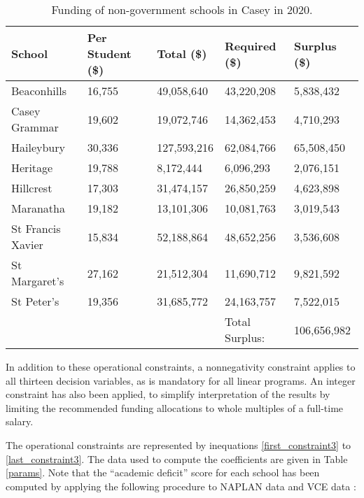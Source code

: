 \documentclass[11pt, a4paper]{article}
\begin{document}
    \begin{table}[!ht]
        \centering
        \caption{Funding of non-government schools in Casey in 2020.}
        \begin{tabular}{|l|l|l|l|l|}
        \hline
            School & Per Student (\$) & Total (\$) & Required (\$)  & Surplus (\$)  \\ \hline
            Beaconhills & 16,755 & 49,058,640 & 43,220,208 & 5,838,432  \\ \hline
            Casey Grammar & 19,602 & 19,072,746 & 14,362,453 & 4,710,293  \\ \hline
            Haileybury & 30,336 & 127,593,216 & 62,084,766 & 65,508,450  \\ \hline
            Heritage & 19,788 & 8,172,444 & 6,096,293 & 2,076,151  \\ \hline
            Hillcrest & 17,303 & 31,474,157 & 26,850,259 & 4,623,898  \\ \hline
            Maranatha & 19,182 & 13,101,306 & 10,081,763 & 3,019,543  \\ \hline
            St Francis Xavier & 15,834 & 52,188,864 & 48,652,256 & 3,536,608  \\ \hline
            St Margaret's & 27,162 & 21,512,304 & 11,690,712 & 9,821,592  \\ \hline
            St Peter's & 19,356 & 31,685,772 & 24,163,757 & 7,522,015  \\ \hline
            ~ & ~ & ~ & Total Surplus: & 106,656,982  \\ \hline
        \end{tabular}
        \label{private_funding}
    \end{table}

    In addition to these operational constraints, a nonnegativity constraint applies to all thirteen decision variables, as is mandatory for all linear programs. An integer constraint has also been applied, to simplify interpretation of the results by limiting the recommended funding allocations to whole multiples of a full-time salary. 

    The operational constraints are represented by inequations \ref{first_constraint3} to \ref{last_constraint3}. The data used to compute the coefficients are given in Table \ref{params}. Note that the ``academic deficit'' score for each school has been computed by applying the following procedure to NAPLAN data \parencite{naplan} and VCE data \parencite{vce_scores}:
\end{document}
